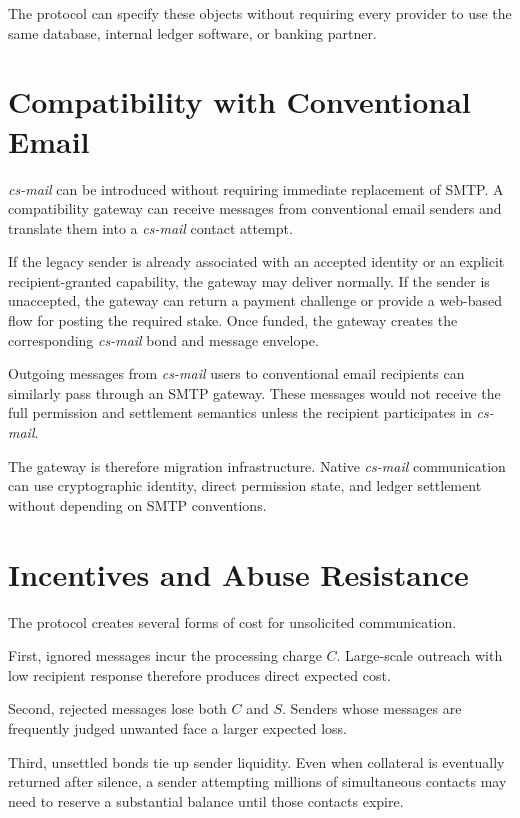 \documentclass[11pt]{article}
\begin{document}
The protocol can specify these objects without requiring every provider to use the same database, internal ledger software, or banking partner.

\section{Compatibility with Conventional Email}

\textit{cs-mail} can be introduced without requiring immediate replacement of SMTP. A compatibility gateway can receive messages from conventional email senders and translate them into a \textit{cs-mail} contact attempt.

If the legacy sender is already associated with an accepted identity or an explicit recipient-granted capability, the gateway may deliver normally. If the sender is unaccepted, the gateway can return a payment challenge or provide a web-based flow for posting the required stake. Once funded, the gateway creates the corresponding \textit{cs-mail} bond and message envelope.

Outgoing messages from \textit{cs-mail} users to conventional email recipients can similarly pass through an SMTP gateway. These messages would not receive the full permission and settlement semantics unless the recipient participates in \textit{cs-mail}.

The gateway is therefore migration infrastructure. Native \textit{cs-mail} communication can use cryptographic identity, direct permission state, and ledger settlement without depending on SMTP conventions.

\section{Incentives and Abuse Resistance}

The protocol creates several forms of cost for unsolicited communication.

First, ignored messages incur the processing charge $C$. Large-scale outreach with low recipient response therefore produces direct expected cost.

Second, rejected messages lose both $C$ and $S$. Senders whose messages are frequently judged unwanted face a larger expected loss.

Third, unsettled bonds tie up sender liquidity. Even when collateral is eventually returned after silence, a sender attempting millions of simultaneous contacts may need to reserve a substantial balance until those contacts expire.
\end{document}
